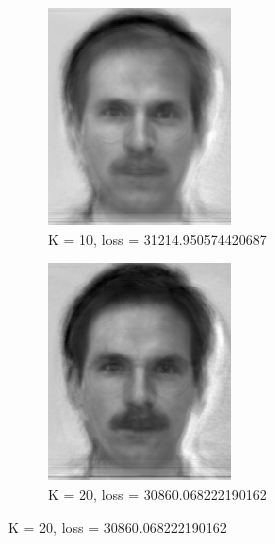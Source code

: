 \documentclass[12pt,letterpaper]{article}
\begin{document}
\begin{figure}
\captionsetup[subfigure]{labelformat=empty}
\centering
\begin{subfigure}{.5\textwidth}
  \centering
  \includegraphics[width=.4\linewidth]{res0210.png}
  \caption{K = 10, loss = 31214.950574420687}
  \label{fig:sub1}
\end{subfigure}%
\begin{subfigure}{.5\textwidth}
  \centering
  \includegraphics[width=.4\linewidth]{res0220.png}
  \caption{K = 20, loss = 30860.068222190162}
  \label{fig:sub2}
\end{subfigure}
\label{fig:test}
\end{figure}
\end{document}
